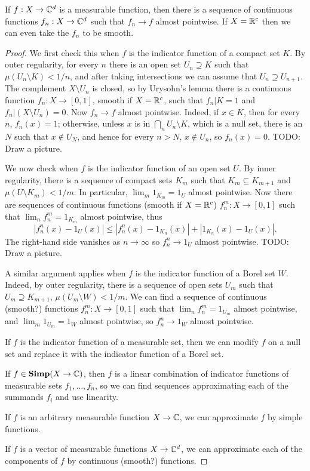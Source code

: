 \begin{lemma}
\label{smooth functions are pointwise dense}
If $f: X \to \mathbb{C}^d$ is a measurable function, then there is a sequence of continuous functions $f_n: X \to \mathbb{C}^d$ such that $f_n \to f$ almost pointwise.
If $X = \mathbb{R}^c$ then we can even take the $f_n$ to be smooth.
\end{lemma}
\begin{proof}
We first check this when $f$ is the indicator function of a compact set $K$.
By outer regularity, for every $n$ there is an open set $U_n \supseteq K$ such that $\mu(U_n \setminus K) < 1/n$, and after taking intersections we can assume that $U_n \supseteq U_{n+1}$.
The complement $X \setminus U_n$ is closed, so by Urysohn's lemma there is a continuous function $f_n: X \to [0, 1]$, smooth if $X = \mathbb{R}^c$, such that $f_n|K = 1$ and $f_n|(X \setminus U_n) = 0$.
Now $f_n \to f$ almost pointwise. Indeed, if $x \in K$, then for every $n$, $f_n(x) = 1$; otherwise, unless $x$ is in $\bigcap_n U_n \setminus K$, which is a null set, there is an $N$ such that $x \notin U_N$, and hence for every $n > N$, $x \notin U_n$, so $f_n(x) = 0$.
TODO: Draw a picture.

We now check when $f$ is the indicator function of an open set $U$.
By inner regularity, there is a sequence of compact sets $K_m$ such that $K_m \subseteq K_{m+1}$ and $\mu(U \setminus K_m) < 1/m$.
In particular, $\lim_m 1_{K_m} = 1_U$ almost pointwise.
Now there are sequences of continuous functions (smooth if $X = \mathbb{R}^c$) $f_n^m: X \to [0, 1]$ such that $\lim_n f_n^m = 1_{K_m}$ almost pointwise, thus
\[|f_n^n(x) - 1_U(x)| \leq |f_n^n(x) - 1_{K_n}(x)| + |1_{K_n}(x) - 1_U(x)|.\]
The right-hand side vanishes as $n \to \infty$ so $f_n^n \to 1_U$ almost pointwise.
TODO: Draw a picture.

A similar argument applies when $f$ is the indicator function of a Borel set $W$.
Indeed, by outer regularity, there is a sequence of open sets $U_m$ such that $U_m \supseteq K_{m+1}$, $\mu(U_m \setminus W) < 1/m$.
We can find a sequence of continuous (smooth?) functions $f_n^m: X \to [0, 1]$ such that $\lim_n f_n^m = 1_{U_m}$ almost pointwise, and $\lim_m 1_{U_m} = 1_W$ almost pointwise, so $f_n^n \to 1_W$ almost pointwise.

If $f$ is the indicator function of a measurable set, then we can modify $f$ on a null set and replace it with the indicator function of a Borel set.

If $f \in \mathbf{Simp}(X \to \mathbb{C})$, then $f$ is a linear combination of indicator functions of measurable sets $f_1, \dots, f_n$, so we can find sequences approximating each of the summands $f_i$ and use linearity.

If $f$ is an arbitrary measurable function $X \to \mathbb{C}$, we can approximate $f$ by simple functions.

If $f$ is a vector of measurable functions $X \to \mathbb{C}^d$, we can approximate each of the components of $f$ by continuous (smooth?) functions.
\end{proof}

